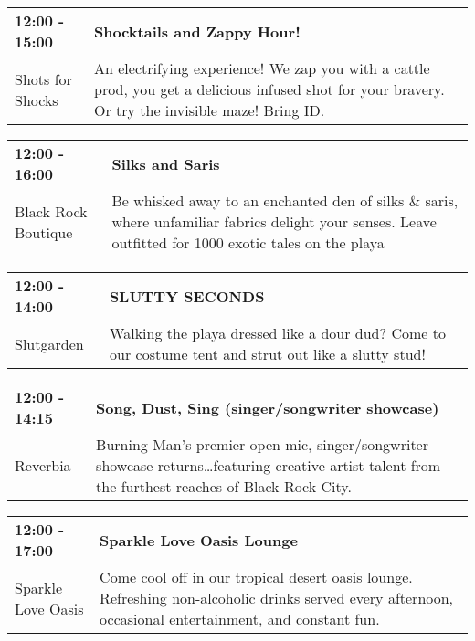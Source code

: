 \begin{tabular}{ p{1in} p{2.2in} }
    \textbf{12:00 - 15:00} & \textbf{Shocktails and Zappy Hour! } \\
    Shots for Shocks \newline  & An electrifying experience! We zap you with a cattle prod, you get a delicious infused shot for your bravery. Or try the invisible maze! Bring ID. \\
    \hline 
\end{tabular}
    
\begin{tabular}{ p{1in} p{2.2in} }
    \textbf{12:00 - 16:00} & \textbf{Silks and Saris} \\
    Black Rock Boutique \newline  & Be whisked away to an enchanted den of silks \& saris, where unfamiliar fabrics delight your senses. Leave outfitted for 1000 exotic tales on the playa \\
    \hline 
\end{tabular}
    
\begin{tabular}{ p{1in} p{2.2in} }
    \textbf{12:00 - 14:00} & \textbf{SLUTTY SECONDS} \\
    Slutgarden \newline  & Walking the playa dressed like a dour dud? Come to our costume tent and strut out like a slutty stud! \\
    \hline 
\end{tabular}
    
\begin{tabular}{ p{1in} p{2.2in} }
    \textbf{12:00 - 14:15} & \textbf{Song, Dust, Sing (singer/songwriter showcase)} \\
    Reverbia \newline  & Burning Man's premier open mic, singer/songwriter showcase returns\ldots featuring creative artist talent from the furthest reaches of Black Rock City. \\
    \hline 
\end{tabular}
    
\begin{tabular}{ p{1in} p{2.2in} }
    \textbf{12:00 - 17:00} & \textbf{Sparkle Love Oasis Lounge} \\
    Sparkle Love Oasis \newline  & Come cool off in our tropical desert oasis lounge. Refreshing non-alcoholic drinks served every afternoon, occasional entertainment, and constant fun. \\
    \hline 
\end{tabular}
    
